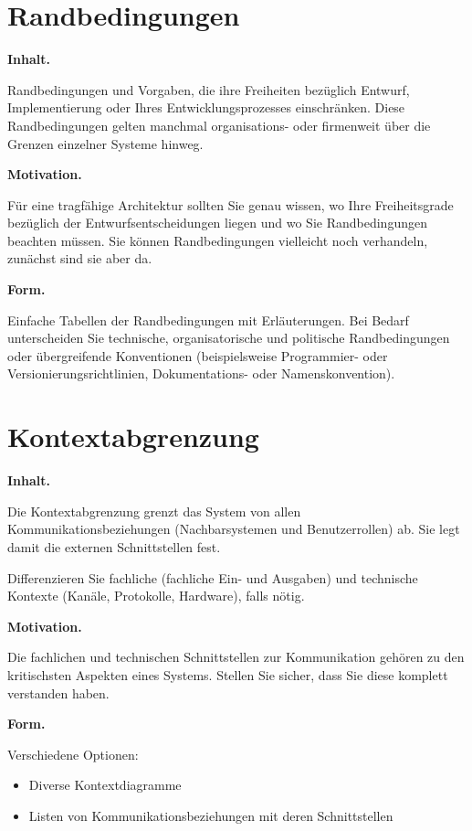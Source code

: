 \documentclass[]{article}
\begin{document}
\hypertarget{section-architecture-constraints}{%
\section{Randbedingungen}\label{section-architecture-constraints}}

\textbf{Inhalt.}

Randbedingungen und Vorgaben, die ihre Freiheiten bezüglich Entwurf,
Implementierung oder Ihres Entwicklungsprozesses einschränken. Diese
Randbedingungen gelten manchmal organisations- oder firmenweit über die
Grenzen einzelner Systeme hinweg.

\textbf{Motivation.}

Für eine tragfähige Architektur sollten Sie genau wissen, wo Ihre
Freiheitsgrade bezüglich der Entwurfsentscheidungen liegen und wo Sie
Randbedingungen beachten müssen. Sie können Randbedingungen vielleicht
noch verhandeln, zunächst sind sie aber da.

\textbf{Form.}

Einfache Tabellen der Randbedingungen mit Erläuterungen. Bei Bedarf
unterscheiden Sie technische, organisatorische und politische
Randbedingungen oder übergreifende Konventionen (beispielsweise
Programmier- oder Versionierungsrichtlinien, Dokumentations- oder
Namenskonvention).

\hypertarget{section-system-scope-and-context}{%
\section{Kontextabgrenzung}\label{section-system-scope-and-context}}

\textbf{Inhalt.}

Die Kontextabgrenzung grenzt das System von allen
Kommunikationsbeziehungen (Nachbarsystemen und Benutzerrollen) ab. Sie
legt damit die externen Schnittstellen fest.

Differenzieren Sie fachliche (fachliche Ein- und Ausgaben) und
technische Kontexte (Kanäle, Protokolle, Hardware), falls nötig.

\textbf{Motivation.}

Die fachlichen und technischen Schnittstellen zur Kommunikation gehören
zu den kritischsten Aspekten eines Systems. Stellen Sie sicher, dass Sie
diese komplett verstanden haben.

\textbf{Form.}

Verschiedene Optionen:

\begin{itemize}
\item
  Diverse Kontextdiagramme
\item
  Listen von Kommunikationsbeziehungen mit deren Schnittstellen
\end{itemize}
\end{document}
